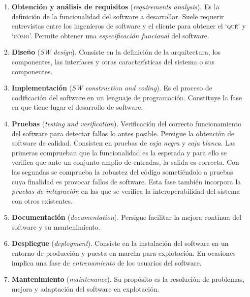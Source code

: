 \begin{enumerate}[1.-]
\item \textbf{Obtención y análisis de requisitos}
(\emph{requirements analysis}). Es la definición de la funcionalidad del 
software a desarrollar. Suele requerir entrevistas entre los ingenieros de software 
y el cliente para obtener el `\textsc{qué}' y `\textsc{cómo}'. Permite obtener una 
\emph{especificación funcional} del software.

\item \textbf{Diseño} (\emph{SW design}). Consiste en la 
definición de la arquitectura, los componentes, las interfaces y otras 
características del sistema o sus componentes.

\item \textbf{Implementación} (\emph{SW construction and coding}). Es el
  proceso de codificación del software en un lenguaje de programación.
  Constituye la fase en que tiene lugar el desarrollo de software.

\item \textbf{Pruebas} (\emph{testing and verification}).
Verificación del correcto funcionamiento del software para detectar fallos lo 
antes posible. Persigue la obtención de software de calidad. Consisten en 
pruebas de \emph{caja negra} y \emph{caja blanca}. Las primeras comprueban 
que la funcionalidad es la esperada y para ello se verifica que ante un 
conjunto amplio de entradas, la salida es correcta. Con las segundas se 
comprueba la robustez del código sometiéndolo a pruebas cuya finalidad es 
provocar fallos de software. Esta fase también incorpora la \emph{pruebas de 
integración} en las que se verifica la interoperabilidad del sistema con 
otros existentes.

\item \textbf{Documentación} (\emph{documentation}). Persigue facilitar la mejora continua del software y su mantenimiento.

\item \textbf{Despliegue} (\emph{deployment}). Consiste en 
la instalación del software en un entorno de producción y puesta en marcha 
para explotación. En ocasiones implica una fase de \emph{entrenamiento} de 
los usuarios del software.

\item \textbf{Mantenimiento} (\emph{maintenance}). Su 
propósito es la resolución de problemas, mejora y adaptación del software en 
explotación.
\end{enumerate}




